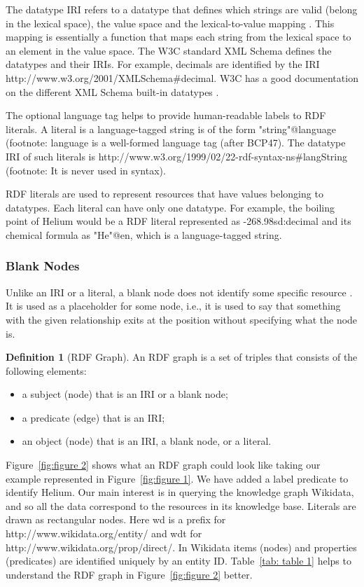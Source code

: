 \documentclass[12 pt, a4paper]{report}
\theoremstyle{definition}
\newtheorem{definition}{Definition}[section]
\begin{document}
The datatype IRI refers to a datatype that defines which strings are valid (belong in the lexical space), the value space and the lexical-to-value mapping \cite{ Bonduel2019}. This mapping is essentially a function that maps each string from the lexical space to an element in the value space. The W3C  standard XML Schema defines the datatypes and their IRIs. For example, decimals are identified by the IRI http://www.w3.org/2001/XMLSchema\#decimal. W3C has a good documentation on the different XML Schema built-in datatypes \cite{ R.Cyganiak2014}.

The optional language tag helps to provide human-readable labels to RDF literals. A literal is a language-tagged string is of the form "string"@language (footnote: language is a well-formed language tag (after BCP47). The datatype IRI of such literals is http://www.w3.org/1999/02/22-rdf-syntax-ns\#langString (footnote: It is never used in syntax).


RDF literals are used to represent resources that have values belonging to datatypes. Each literal can have only one datatype. For example, the boiling point of Helium would be a RDF literal represented as -268.9^^xsd:decimal and its chemical formula as "He"@en, which is a language-tagged string. 

\subsubsection{Blank Nodes}
Unlike an IRI or a literal, a blank node does not identify some specific resource \cite{ R.Cyganiak2014}. It is used as a placeholder for some node, i.e., it is used to say that something with the given relationship exits at the position without specifying what the node is.

\begin{definition}[RDF Graph]
An RDF graph is a set of triples that consists of the following elements: 

\begin{itemize}
	\item a subject (node) that is an IRI or a blank node; 
	\item a predicate (edge) that is an IRI; 
	\item an object (node) that is an IRI, a blank node, or a literal. 
\end{itemize}	
\end{definition}

Figure~\ref{fig:figure 2} shows what an RDF graph could look like taking our example represented in Figure~\ref{fig:figure 1}. We have added a label predicate to identify Helium. Our main interest is in querying the knowledge graph Wikidata, and so all the data correspond to the resources in its knowledge base. Literals are drawn as rectangular nodes. Here wd is a prefix for http://www.wikidata.org/entity/ and wdt for http://www.wikidata.org/prop/direct/. In Wikidata items (nodes) and properties (predicates) are identified uniquely by an entity ID. Table~\ref{tab: table 1} helps to understand the RDF graph in Figure~\ref{fig:figure 2} better.
\end{document}
